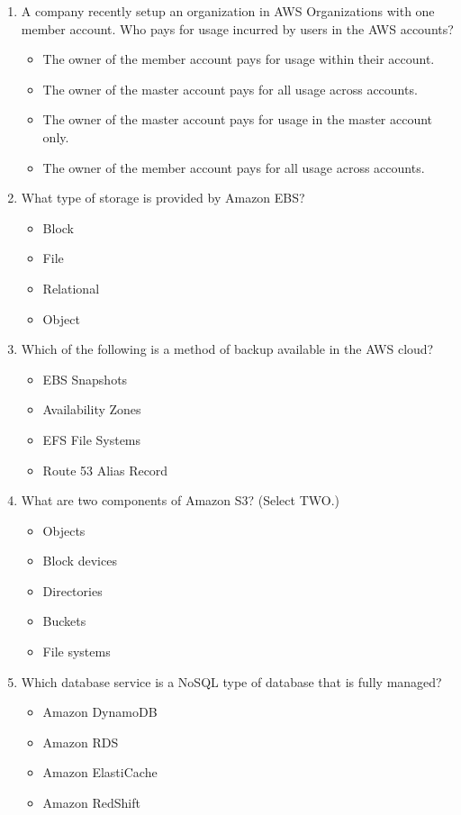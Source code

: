 \begin{enumerate}
	\item A company recently setup an organization in AWS Organizations with one member account. Who pays for usage incurred by users in the AWS accounts?
	\begin{itemize}
		\item The owner of the member account pays for usage within their account.
		\item The owner of the master account pays for all usage across accounts.
		\item The owner of the master account pays for usage in the master account only.
		\item The owner of the member account pays for all usage across accounts.
	\end{itemize}

	\item What type of storage is provided by Amazon EBS?
	\begin{itemize}
		\item Block
		\item File
		\item Relational
		\item Object
	\end{itemize}

	\item Which of the following is a method of backup available in the AWS cloud?
	\begin{itemize}
		\item EBS Snapshots
		\item Availability Zones
		\item EFS File Systems
		\item Route 53 Alias Record
	\end{itemize}

	\item What are two components of Amazon S3? (Select TWO.)
	\begin{itemize}
		\item Objects
		\item Block devices
		\item Directories
		\item Buckets
		\item File systems
	\end{itemize}

	\item Which database service is a NoSQL type of database that is fully managed?
	\begin{itemize}
		\item Amazon DynamoDB
		\item Amazon RDS
		\item Amazon ElastiCache
		\item Amazon RedShift
	\end{itemize}


\end{enumerate}
